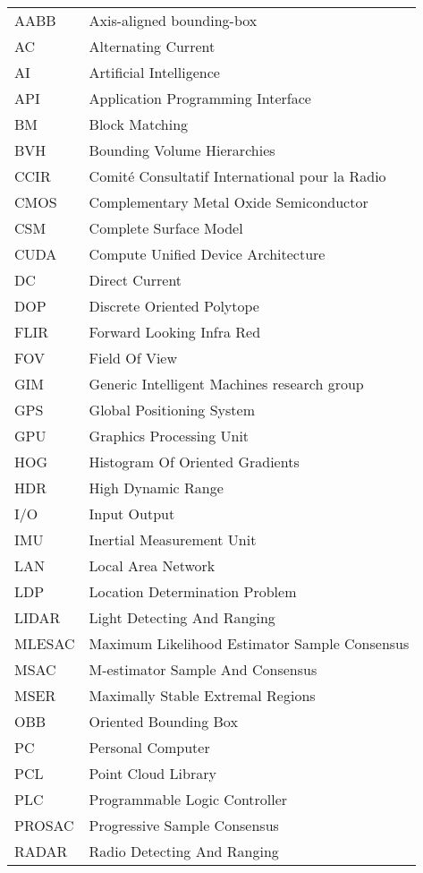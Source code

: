 \documentclass[12pt,a4paper,oneside,pdftex]{report}
\begin{document}
\noindent
\begin{longtable}{@{}p{}p{}@{}}
AABB & Axis-aligned bounding-box \\
AC & Alternating Current \\
AI & Artificial Intelligence \\
API & Application Programming Interface \\
BM & Block Matching \\
BVH & Bounding Volume Hierarchies \\
CCIR & Comité Consultatif International pour la Radio \\
CMOS & Complementary Metal Oxide Semiconductor \\
CSM & Complete Surface Model \\
CUDA & Compute Unified Device Architecture \\
DC & Direct Current \\
DOP & Discrete Oriented Polytope \\
FLIR & Forward Looking Infra Red \\
FOV & Field Of View \\
GIM & Generic Intelligent Machines research group \\
GPS & Global Positioning System \\
GPU & Graphics Processing Unit \\
HOG & Histogram Of Oriented Gradients \\
HDR & High Dynamic Range \\
I/O & Input Output\\
IMU & Inertial Measurement Unit \\
LAN & Local Area Network \\
LDP & Location Determination Problem \\
LIDAR & Light Detecting And Ranging \\
MLESAC & Maximum Likelihood Estimator Sample Consensus \\
MSAC & M-estimator Sample And Consensus \\
MSER & Maximally Stable Extremal Regions \\ 
OBB & Oriented Bounding Box \\
PC & Personal Computer \\
PCL & Point Cloud Library \\
PLC & Programmable Logic Controller \\
PROSAC & Progressive Sample Consensus \\
RADAR & Radio Detecting And Ranging \\

\end{longtable}
\end{document}
